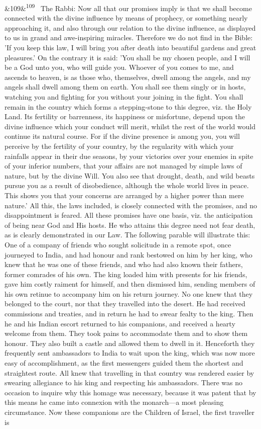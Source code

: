 \documentclass[12pt]{article}
\newcommand{\para}[1][]{\par\noindent\ifx&#1&\else\textsuperscript{\footnotesize #1}~\fi}
\begin{document}
\para[109] The Rabbi: Now all that our promises imply is that we shall become connected with the divine influence by means of prophecy, or something nearly approaching it, and also through our relation to the divine influence, as displayed to us in grand and awe-inspiring miracles. Therefore we do not find in the Bible: 'If you keep this law, I will bring you after death into beautiful gardens and great pleasures.' On the contrary it is said: 'You shall be my chosen people, and I will be a God unto you, who will guide you. Whoever of you comes to me, and ascends to heaven, is as those who, themselves, dwell among the angels, and my angels shall dwell among them on earth. You shall see them singly or in hosts, watching you and fighting for you without your joining in the fight. You shall remain in the country which forms a stepping-stone to this degree, viz. the Holy Land. Its fertility or barrenness, its happiness or misfortune, depend upon the divine influence which your conduct will merit, whilst the rest of the world would continue its natural course. For if the divine presence is among you, you will perceive by the fertility of your country, by the regularity with which your rainfalls appear in their due seasons, by your victories over your enemies in spite of your inferior numbers, that your affairs are not managed by simple laws of nature, but by the divine Will. You also see that drought, death, and wild beasts pursue you as a result of disobedience, although the whole world lives in peace. This shows you that your concerns are arranged by a higher power than mere nature.' All this, the laws included, is closely connected with the promises, and no disappointment is feared. All these promises have one basis, viz. the anticipation of being near God and His hosts. He who attains this degree need not fear death, as is clearly demonstrated in our Law. The following parable will illustrate this: One of a company of friends who sought solicitude in a remote spot, once journeyed to India, and had honour and rank bestowed on him by her king, who knew that he was one of these friends, and who had also known their fathers, former comrades of his own. The king loaded him with presents for his friends, gave him costly raiment for himself, and then dismissed him, sending members of his own retinue to accompany him on his return journey. No one knew that they belonged to the court, nor that they travelled into the desert. He had received commissions and treaties, and in return he had to swear fealty to the king. Then he and his Indian escort returned to his companions, and received a hearty welcome from them. They took pains to accommodate them and to show them honour. They also built a castle and allowed them to dwell in it. Henceforth they frequently sent ambassadors to India to wait upon the king, which was now more easy of accomplishment, as the first messengers guided them the shortest and straightest route. All knew that travelling in that country was rendered easier by swearing allegiance to his king and respecting his ambassadors. There was no occasion to inquire why this homage was necessary, because it was patent that by this means he came into connexion with the monarch---a most pleasing circumstance. Now these companions are the Children of Israel, the first traveller is 
\end{document}
